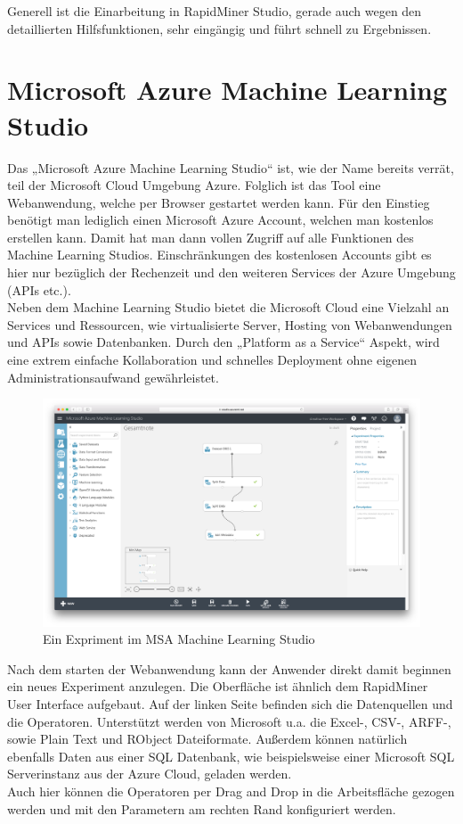 Generell ist die Einarbeitung in RapidMiner Studio, gerade auch wegen den
detaillierten Hilfsfunktionen, sehr eingängig und führt schnell zu Ergebnissen.

\pagebreak

\section{Microsoft Azure Machine Learning Studio}
\label{sec:software:msa}

Das „Microsoft Azure Machine Learning Studio“ ist, wie der Name bereits verrät,
teil der Microsoft Cloud Umgebung Azure. Folglich ist das Tool eine Webanwendung,
welche per Browser gestartet werden kann.  Für den Einstieg benötigt man
lediglich einen Microsoft Azure Account, welchen man kostenlos erstellen kann.
Damit hat man dann vollen Zugriff auf alle Funktionen des Machine Learning
Studios. Einschränkungen des kostenlosen Accounts gibt es hier nur bezüglich
der Rechenzeit und den weiteren Services der Azure Umgebung (APIs etc.). \\
Neben dem Machine Learning Studio bietet die Microsoft Cloud eine Vielzahl an
Services und Ressourcen, wie virtualisierte Server, Hosting von Webanwendungen
und APIs sowie Datenbanken. Durch den „Platform as a Service“ Aspekt, wird eine
extrem einfache Kollaboration und schnelles Deployment ohne eigenen
Administrationsaufwand gewährleistet.

\begin{figure}[htb]
	\includegraphics[width=\textwidth]{gfx/ml1.png}
	\caption{Ein Expriment im MSA Machine Learning Studio}
	\label{fig:software:ml:des}
\end{figure}

Nach dem starten der Webanwendung kann der Anwender direkt damit beginnen ein
neues Experiment anzulegen. Die Oberfläche ist ähnlich dem RapidMiner User
Interface aufgebaut. Auf der linken Seite befinden sich die Datenquellen und
die Operatoren. Unterstützt werden von Microsoft u.a. die Excel-, CSV-, ARFF-,
sowie Plain Text und RObject Dateiformate. Außerdem können natürlich ebenfalls
Daten aus einer SQL Datenbank, wie beispielsweise einer Microsoft SQL
Serverinstanz aus der Azure Cloud, geladen werden. \\
Auch hier können die Operatoren per Drag and Drop in die Arbeitsfläche gezogen
werden und mit den Parametern am rechten Rand konfiguriert werden.

